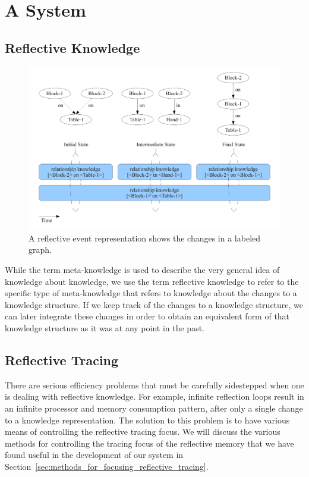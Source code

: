 \chapter{A System}\label{ch:a_system}

\section{Reflective Knowledge}

\begin{figure}[bth]
  \center
  \includegraphics[width=12cm]{gfx/reflective_event_representation}
  \caption[A reflective event representation]{A reflective event representation shows the changes in a labeled graph.}
  \label{fig:reflective_event_representation}
\end{figure}


While the term meta-knowledge is used to describe the very general
idea of knowledge about knowledge, we use the term reflective
knowledge to refer to the specific type of meta-knowledge that refers
to knowledge about the changes to a knowledge structure.  If we keep
track of the changes to a knowledge structure, we can later integrate
these changes in order to obtain an equivalent form of that knowledge
structure as it was at any point in the past.


\section{Reflective Tracing}
\label{sec:reflective_tracing}

There are serious efficiency problems that must be carefully
sidestepped when one is dealing with reflective knowledge.  For
example, infinite reflection loops result in an infinite processor and
memory consumption pattern, after only a single change to a knowledge
representation.  The solution to this problem is to have various means
of controlling the reflective tracing focus.  We will discuss the
various methods for controlling the tracing focus of the reflective
memory that we have found useful in the development of our system in
Section~\ref{sec:methods_for_focusing_reflective_tracing}.


